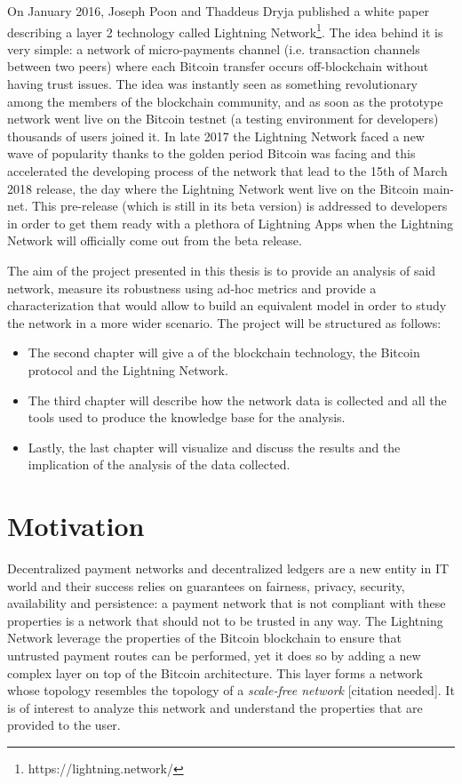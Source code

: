 		On January 2016, Joseph Poon and Thaddeus Dryja published a white paper describing a layer 2 technology called Lightning Network\footnote{https://lightning.network/}. The idea behind it is very simple: a network of micro-payments channel (i.e. transaction channels between two peers) where each Bitcoin transfer occurs off-blockchain without having trust issues. The idea was instantly seen as something revolutionary among the members of the blockchain community, and as soon as the prototype network went live on the Bitcoin testnet (a testing environment for developers) thousands of users joined it. In late 2017 the Lightning Network faced a new wave of popularity thanks to the golden period Bitcoin was facing and this accelerated the developing process of the network that lead to the 15th of March 2018 release, the day where the Lightning Network went live on the Bitcoin main-net. This pre-release (which is still in its beta version) is addressed to developers in order to get them ready with a plethora of Lightning Apps when the Lightning Network will officially come out from the beta release.
		
		The aim of the project presented in this thesis is to provide an analysis of said network, measure its robustness using ad-hoc metrics and provide a characterization that would allow to build an equivalent model in order to study the network in a more wider scenario. The project will be structured as follows:
		\begin{itemize}
			\item The second chapter will give a  of the blockchain technology, the Bitcoin protocol and the Lightning Network.
			\item The third chapter will describe how the network data is collected and all the tools used to produce the knowledge base for the analysis.
			\item Lastly, the last chapter will visualize and discuss the results and the implication of the analysis of the data collected.
		\end{itemize}
	\section{Motivation}
		Decentralized payment networks and decentralized ledgers are a new entity in IT world and their success relies on guarantees on fairness, privacy, security, availability and persistence: a payment network that is not compliant with these properties is a network that should not to be trusted in any way. The Lightning Network leverage the properties of the Bitcoin blockchain to ensure that untrusted payment routes can be performed, yet it does so by adding a new complex layer on top of the Bitcoin architecture. This layer forms a network whose topology resembles the topology of a \textit{scale-free network} [citation needed]. It is of interest to analyze this network and understand the properties that are provided to the user. 
		
